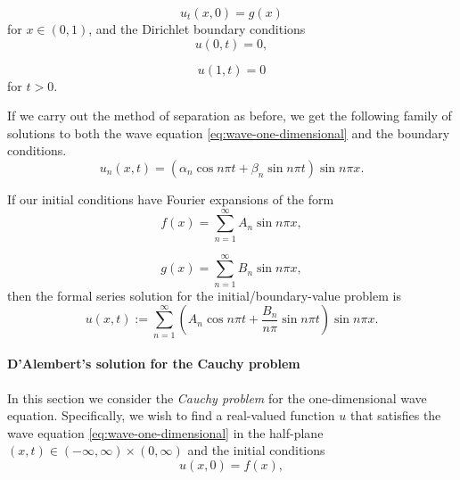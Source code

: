 \begin{equation}\label{eq:wave-interval-initial-velocity}
u_t(x,0)=g(x)
\end{equation}
for $x\in(0,1)$, and the Dirichlet boundary conditions
\begin{equation}\label{eq:wave-left-boundary}
u(0,t)=0,
\end{equation}

\begin{equation}\label{eq:wave-right-boundary}
u(1,t)=0
\end{equation}
for $t>0$.

If we carry out the method of separation as before, we get the following family of solutions to both the wave equation \eqref{eq:wave-one-dimensional} and the boundary conditions.
\begin{equation}\label{eq:wave-separated-modes}
u_n(x,t)=(\alpha_n\cos n\pi t+\beta_n\sin n\pi t)\sin n\pi x.
\end{equation}


If our initial conditions have Fourier expansions of the form
\begin{equation}\label{eq:wave-position-fourier-series}
f(x)=\sum_{n=1}^{\infty}A_n\sin n\pi x,
\end{equation}

\begin{equation}\label{eq:wave-velocity-fourier-series}
g(x)=\sum_{n=1}^{\infty}B_n\sin n\pi x,
\end{equation}
then the formal series solution for the initial/boundary-value problem is
\begin{equation}\label{eq:wave-interval-series-solution}
u(x,t):=\sum_{n=1}^{\infty}\left(A_n\cos n\pi t+\dfrac{B_n}{n\pi}\sin n\pi t\right)\sin n\pi x.
\end{equation}


\paragraph*{D'Alembert's solution for the Cauchy problem}

In this section we consider the \emph{Cauchy problem} for the one-dimensional wave equation. Specifically, we wish to find a real-valued function $u$ that satisfies the wave equation \eqref{eq:wave-one-dimensional} in the half-plane $(x,t)\in(-\infty,\infty)\times(0,\infty)$ and the initial conditions
\begin{equation}\label{eq:wave-cauchy-initial-position}
u(x,0)=f(x),
\end{equation}

